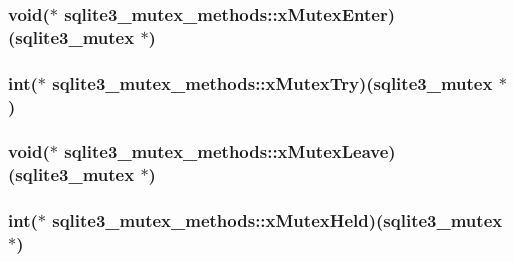 \hypertarget{structsqlite3__mutex__methods_c60f7bb165e9770949a8a2b2c2632830}{
\subsubsection[xMutexEnter]{\setlength{\rightskip}{0pt plus 5cm}void($\ast$ {\bf sqlite3\_\-mutex\_\-methods::xMutexEnter})({\bf sqlite3\_\-mutex} $\ast$)}}
\label{structsqlite3__mutex__methods_c60f7bb165e9770949a8a2b2c2632830}


\hypertarget{structsqlite3__mutex__methods_45682df41bdfcb267a696090c80ebd06}{
\subsubsection[xMutexTry]{\setlength{\rightskip}{0pt plus 5cm}int($\ast$ {\bf sqlite3\_\-mutex\_\-methods::xMutexTry})({\bf sqlite3\_\-mutex} $\ast$)}}
\label{structsqlite3__mutex__methods_45682df41bdfcb267a696090c80ebd06}


\hypertarget{structsqlite3__mutex__methods_cfa193f9130bfc68caf7f1849bcd0dac}{
\subsubsection[xMutexLeave]{\setlength{\rightskip}{0pt plus 5cm}void($\ast$ {\bf sqlite3\_\-mutex\_\-methods::xMutexLeave})({\bf sqlite3\_\-mutex} $\ast$)}}
\label{structsqlite3__mutex__methods_cfa193f9130bfc68caf7f1849bcd0dac}


\hypertarget{structsqlite3__mutex__methods_5d30a95c614bc08fe156c9ea0f0d88e8}{
\subsubsection[xMutexHeld]{\setlength{\rightskip}{0pt plus 5cm}int($\ast$ {\bf sqlite3\_\-mutex\_\-methods::xMutexHeld})({\bf sqlite3\_\-mutex} $\ast$)}}
\label{structsqlite3__mutex__methods_5d30a95c614bc08fe156c9ea0f0d88e8}


